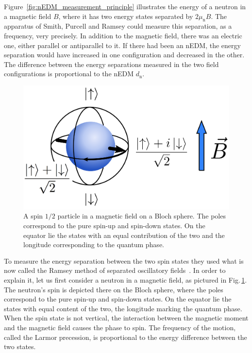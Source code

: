 Figure~\ref{fig:nEDM_measurement_principle} illustrates the energy of a neutron in a magnetic field $B$, where it has two energy states separated by $2 \mu_\text{n} B$. The apparatus of Smith, Purcell and Ramsey could measure this separation, as a frequency, very precisely. In addition to the magnetic field, there was an electric one, either parallel or antiparallel to it. If there had been an nEDM, the energy separation would have increased in one configuration and decreased in the other. The difference between the energy separations measured in the two field configurations is proportional to the nEDM $d_\text{n}$.

\begin{figure}
  \centering
  \includegraphics[width=.6\linewidth]{gfx/nEDMatPSI/bloch_sphere.png}
  \caption{A spin $1/2$ particle in a magnetic field on a Bloch sphere. The poles correspond to the pure spin-up and spin-down states. On the equator lie the states with an equal contribution of the two and the longitude corresponding to the quantum phase.}\label{fig:nEDM_bloch_sphere}
\end{figure}

To measure the energy separation between the two spin states they used what is now called the Ramsey method of separated oscillatory fields~\cite{PhysRev.76.996}. In order to explain it, let us first consider a neutron in a magnetic field, as pictured in Fig.\,\ref{fig:nEDM_bloch_sphere}. The neutron's spin is depicted there on the Bloch sphere, where the poles correspond to the pure spin-up and spin-down states. On the equator lie the states with equal content of the two, the longitude marking the quantum phase. When the spin state is not vertical, the interaction between the magnetic moment and the magnetic field causes the phase to spin. The frequency of the motion, called the Larmor precession, is proportional to the energy difference between the two states.

